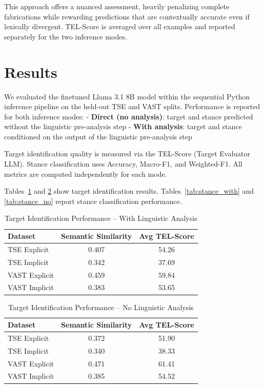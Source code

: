 \documentclass[conference]{IEEEtran}
\begin{document}
This approach offers a nuanced assessment, heavily penalizing complete fabrications while rewarding predictions that are contextually accurate even if lexically divergent. TEL-Score is averaged over all examples and reported separately for the two inference modes.

\section{Results}

We evaluated the finetuned Llama 3.1 8B model within the sequential Python inference pipeline on the held-out TSE and VAST splits. Performance is reported for both inference modes:  
- \textbf{Direct (no analysis)}: target and stance predicted without the linguistic pre-analysis step  
- \textbf{With analysis}: target and stance conditioned on the output of the linguistic pre-analysis step  

Target identification quality is measured via the TEL-Score (Target Evaluator LLM). Stance classification uses Accuracy, Macro-F1, and Weighted-F1. All metrics are computed independently for each mode.

Tables~\ref{tab:target_with} and \ref{tab:target_no} show target identification results. Tables~\ref{tab:stance_with} and \ref{tab:stance_no} report stance classification performance.

\begin{table}[htbp]
\centering
\caption{Target Identification Performance -- With Linguistic Analysis}
\label{tab:target_with}
\small
\begin{tabular}{|l|c|c|}
\hline
\textbf{Dataset} & \textbf{Semantic Similarity} & \textbf{Avg TEL-Score} \\
\hline
TSE Explicit     & 0.407 & 54.26 \\
TSE Implicit     & 0.342 & 37.69 \\
VAST Explicit    & 0.459 & 59.84 \\
VAST Implicit    & 0.383 & 53.65 \\
\hline
\end{tabular}
\end{table}

\begin{table}[htbp]
\centering
\caption{Target Identification Performance -- No Linguistic Analysis}
\label{tab:target_no}
\small
\begin{tabular}{|l|c|c|}
\hline
\textbf{Dataset} & \textbf{Semantic Similarity} & \textbf{Avg TEL-Score} \\
\hline
TSE Explicit     & 0.372 & 51.90 \\
TSE Implicit     & 0.340 & 38.33 \\
VAST Explicit    & 0.471 & 61.41 \\
VAST Implicit    & 0.385 & 54.52 \\
\hline
\end{tabular}
\end{table}
\end{document}
